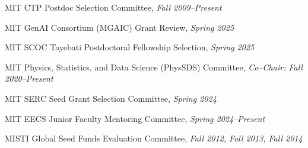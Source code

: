 \item MIT CTP Postdoc Selection Committee, \emph{Fall 2009--Present}
\item MIT GenAI Consortium (MGAIC) Grant Review, \emph{Spring 2025}
\item MIT SCOC Tayebati Postdoctoral Fellowship Selection, \emph{Spring 2025}
\item MIT Physics, Statistics, and Data Science (PhysSDS) Committee, \emph{Co--Chair: Fall 2020--Present}
\item MIT SERC Seed Grant Selection Committee, \emph{Spring 2024}
\item MIT EECS Junior Faculty Mentoring Committee, \emph{Spring 2024--Present}
\item MISTI Global Seed Funds Evaluation Committee, \emph{Fall 2012, Fall 2013, Fall 2014}
\el
